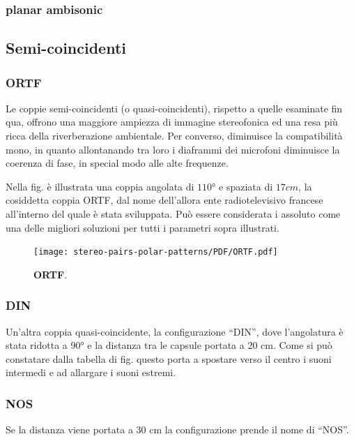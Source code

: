 \subsubsection*{planar ambisonic}
\subsection*{Semi-coincidenti}
\subsubsection*{ORTF}
Le coppie semi-coincidenti (o quasi-coincidenti), rispetto a quelle esaminate fin qua, offrono una
maggiore ampiezza di immagine stereofonica ed una resa più ricca della riverberazione
ambientale. Per converso, diminuisce la compatibilità mono, in quanto allontanando
tra loro i diaframmi dei microfoni diminuisce la coerenza di fase, in special
modo alle alte frequenze.

Nella fig. %
è illustrata una coppia angolata di $110°$ e spaziata
di $17cm$, la cosiddetta coppia ORTF, dal nome dell’allora ente radiotelevisivo
francese all’interno del quale è stata sviluppata. Può essere considerata i
assoluto come una delle migliori soluzioni per tutti i parametri sopra illustrati.
\begin{figure}[h]
\begin{center}
\texttt{[image: stereo-pairs-polar-patterns/PDF/ORTF.pdf]}
\caption{\textbf{ORTF}.}
\label{ORTF}
\end{center}
\end{figure}
\subsubsection*{DIN}
Un’altra coppia quasi-coincidente, la configurazione “DIN”, dove l’angolatura
è stata ridotta a 90° e la distanza tra le capsule portata a 20 cm. Come si può
constatare dalla tabella di fig. %
questo porta a
spostare verso il centro i suoni intermedi e ad allargare i suoni estremi.
\subsubsection*{NOS}
Se la distanza viene portata a 30 cm la configurazione prende il nome di “NOS”.
